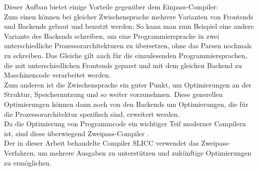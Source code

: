 Dieser Aufbau bietet einige Vorteile gegenüber dem Einpass-Compiler:\\
Zum einen können bei gleicher Zwischensprache mehrere Varianten von Frontends und Backends gebaut und benutzt werden;
So kann man zum Beispiel eine andere Variante des Backends schreiben, um eine Programmiersprache in zwei unterschiedliche Prozessorarchitekturen zu übersetzen, ohne das Parsen nochmals zu schreiben.
Das Gleiche gilt auch für die einzulesenden Programmiersprachen, die mit unterschiedlichen Frontends geparst und mit dem gleichen Backend zu Maschinencode verarbeitet werden.\\
Zum anderen ist die Zwischensprache ein guter Punkt, um Optimierungen an der Struktur, Speichernutzung und so weiter vorzunehmen.
Diese generellen Optimierungen können dann noch von den Backends um Optimierungen, die für die Prozessorarchitektur spezifisch sind, erweitert werden.\\
Da die Optimierung von Programmcode ein wichtiger Teil moderner Compilern ist, sind diese überwiegend Zweipass-Compiler \cite{mossenbock:2024}.\\

Der in dieser Arbeit behandelte Compiler \ac{SLICC} verwendet das Zweipass-Verfahren, um mehrere Ausgaben zu unterstützen und zukünftige Optimierungen zu ermöglichen.
